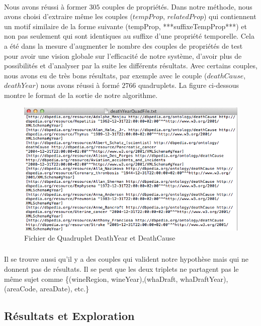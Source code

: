\paragraph{}
Nous avons réussi à former $305$ couples de propriétés. Dans notre méthode, nous avons choisi d'extraire même les couples ($tempProp$, $relatedProp$) qui contiennent un motif similaire de la forme suivante (tempProp, ***suffixeTempProp***) et non pas seulement qui sont identiques au suffixe d'une propriété temporelle. Cela a été dans la mesure d'augmenter le nombre des couples de propriétés de test pour avoir une vision globale sur l'efficacité de notre système, d'avoir plus de possibilités et d'analyser par la suite les différents résultats. 
Avec certains couples, nous avons eu de très bons résultats, par exemple avec le couple ($deathCause$,$deathYear$) nous avons réussi à formé $2766$ quadruplets. La figure ci-dessous montre le format de la sortie de notre algorithme.
 \begin{figure}[H]
        \centering
                \includegraphics[width=15cm]{DeathYearCause.png}
               \caption{Fichier de Quadruplet DeathYear et DeathCause}
\end{figure}
\subparagraph{}
Il se trouve aussi qu'il y a des couples qui valident notre hypothèse mais qui ne donnent pas de résultats. Il se peut que les deux triplets ne partagent pas le même sujet comme \{(wineRegion, wineYear),(whaDraft, whaDraftYear),(areaCode, areaDate), etc.\}
\subsection{Résultats et Exploration}
